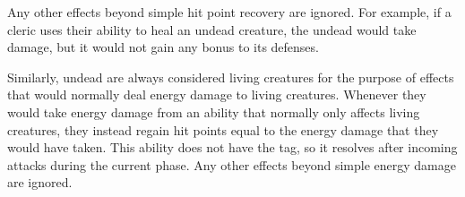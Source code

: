         Any other effects beyond simple hit point recovery are ignored.
        For example, if a cleric uses their  ability to heal an undead creature, the undead would take damage, but it would not gain any bonus to its defenses.

        Similarly, undead are always considered living creatures for the purpose of effects that would normally deal energy damage to living creatures.
        Whenever they would take energy damage from an ability that normally only affects living creatures, they instead regain hit points equal to the energy damage that they would have taken. 
        This ability does not have the  tag, so it resolves after incoming attacks during the current phase.
        Any other effects beyond simple energy damage are ignored.

